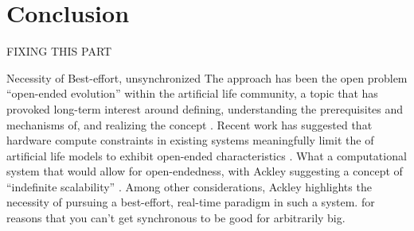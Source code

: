 \section{Conclusion}


FIXING THIS PART

Necessity of Best-effort, unsynchronized 
The approach has been the open problem ``open-ended evolution'' within the artificial life community, a topic that has provoked long-term interest around defining, understanding the prerequisites and mechanisms of, and realizing the concept \cite{taylor2016open}.
Recent work has suggested that hardware compute constraints in existing systems meaningfully limit the of artificial life models to exhibit open-ended characteristics \cite{channon2019maximum}.
What a computational system that would allow for open-endedness, with Ackley suggesting a concept of ``indefinite scalability'' \cite{ackley2011pursue}.
Among other considerations, Ackley highlights the necessity of pursuing a best-effort, real-time paradigm in such a system. for reasons that you can't get synchronous to be good for arbitrarily big.

